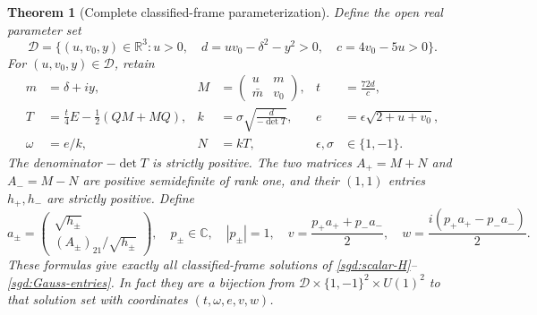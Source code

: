 \documentclass[11pt]{article}
\newtheorem{theorem}{Theorem}
\begin{document}
\begin{theorem}[Complete classified-frame parameterization]
\label{sgd:parametrization}
Define the open real parameter set
\[
 \mathcal D=\{(u,v_0,y)\in\mathbb R^3:
      u>0,\quad d=uv_0-\delta^2-y^2>0,\quad c=4v_0-5u>0\}.
\]
For $(u,v_0,y)\in\mathcal D$, retain
\begin{align}
 m&=\delta+iy,&
 M&=\begin{pmatrix}u&m\\\bar m&v_0\end{pmatrix},&
 t&=\frac{72d}{c},\label{sgd:parameters1}\\
 T&=\frac t4E-\frac12(QM+MQ),&
 k&=\sigma\sqrt{\frac d{-\det T}},&
 e&=\epsilon\sqrt{2+u+v_0},\label{sgd:parameters2}\\
 \omega&=e/k,&N&=kT,& \epsilon,\sigma&\in\{1,-1\}.
 \label{sgd:parameters3}
\end{align}
The denominator $-\det T$ is strictly positive. The two matrices
$A_+=M+N$ and $A_-=M-N$ are positive semidefinite of rank one,
and their $(1,1)$ entries $h_+,h_-$ are strictly positive. Define
\begin{equation}
 a_\pm=\begin{pmatrix}\sqrt{h_\pm}\\(A_\pm)_{21}/\sqrt{h_\pm}\end{pmatrix},
 \quad p_\pm\in\mathbb C,\quad |p_\pm|=1,\quad
 v=\frac{p_+a_++p_-a_-}{2},\quad
 w=\frac{i(p_+a_+-p_-a_-)}{2}.
 \label{sgd:vectors}
\end{equation}
These formulas give exactly all classified-frame solutions of
\eqref{sgd:scalar-H}--\eqref{sgd:Gauss-entries}. In fact they are a
bijection from $\mathcal D\times\{1,-1\}^2\times U(1)^2$ to
that solution set with coordinates $(t,\omega,e,v,w)$.
\end{theorem}
\end{document}
